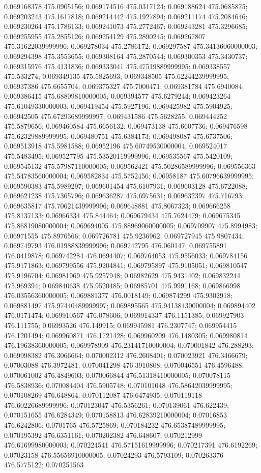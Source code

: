 0.069168378 475.0905156; 0.069174516 475.0317124; 0.069188624 475.0685875; 0.069203243 475.1617818; 0.069214442 475.1927894; 0.069211174 475.2084646; 0.069230264 475.1786133; 0.069241073 475.2772467; 0.069243281 475.3296685; 0.069255955 475.2855126; 0.069254129 475.2890245; 0.069267807 475.31622039999996; 0.069278034 475.2786172; 0.069297587 475.34136060000003; 0.069294398 475.3553655; 0.069308164 475.2870544; 0.069300353 475.3430737; 0.069315976 475.4131836; 0.069333041 475.47519889999995; 0.069338557 475.533274; 0.069349135 475.5825693; 0.069348505 475.62244239999995; 0.06937386 475.6655704; 0.069375327 475.7000471; 0.069381784 475.6940084; 0.069386415 475.68809810000005; 0.069394577 475.6279244; 0.069423264 475.61049330000003; 0.069419454 475.5927196; 0.069425982 475.5904925; 0.06942505 475.67293689999997; 0.069431586 475.5628255; 0.069444252 475.5879656; 0.069460584 475.6656132; 0.069473138 475.6607736; 0.069476598 475.62329889999995; 0.069480751 475.6384173; 0.069498087 475.6737506; 0.069513918 475.5981588; 0.06952196 475.60749530000004; 0.069524017 475.5483495; 0.069527795 475.53520119999996; 0.069535567 475.5420109; 0.069545132 475.57987110000005; 0.069562421 475.50286589999996; 0.069556363 475.54783560000004; 0.069582834 475.5752456; 0.06958187 475.60796639999995; 0.069590383 475.5989297; 0.069601454 475.6107931; 0.069603128 475.6722088; 0.069621238 475.7365796; 0.069636287 475.6975631; 0.069632397 475.716793; 0.069635817 475.70621439999996; 0.069648881 475.8067323; 0.069666258 475.8137133; 0.06966334 475.844464; 0.069679434 475.7624479; 0.069675345 475.86819080000004; 0.069694005 475.88969060000005; 0.069709907 475.8994983; 0.06971555 475.8976566; 0.069726781 475.9236962; 0.069727945 475.9807434; 0.069749793 476.01988839999996; 0.069742795 476.060147; 0.069755891 476.0419878; 0.069742284 476.0694407; 0.069764053 475.9556033; 0.069784156 475.9171863; 0.069799556 475.9204841; 0.069795897 475.9105051; 0.069810547 475.9196704; 0.06981969 475.9257948; 0.06982629 475.9431402; 0.069832244 475.969394; 0.069840638 475.9520485; 0.06985701 475.9991168; 0.069866998 476.03556360000005; 0.069881377 476.0018149; 0.069874299 475.9302918; 0.069881497 475.97440489999997; 0.069895565 475.94138430000004; 0.069894402 476.0171474; 0.069910567 476.078606; 0.069914337 476.1151385; 0.069927903 476.111755; 0.06993526 476.149915; 0.069945981 476.2307747; 0.069954415 476.1201494; 0.069960871 476.1721428; 0.069960209 476.1480305; 0.069980814 476.19638360000005; 0.069978909 476.23141710000004; 0.070001842 476.288293; 0.069998382 476.3066664; 0.070002312 476.2608401; 0.070023921 476.3466679; 0.07003088 476.3972481; 0.070041298 476.3910808; 0.070046551 476.4596488; 0.070061002 476.4849603; 0.070066844 476.51318410000005; 0.070078115 476.5838936; 0.070084404 476.5905748; 0.070101048 476.58642039999995; 0.070108269 476.648864; 0.070112087 476.6474935; 0.070119118 476.60226689999996; 0.070123047 476.5356261; 0.070139061 476.622439; 0.070151655 476.6284349; 0.070158813 476.62839210000004; 0.07016853 476.6242806; 0.0701765 476.5725869; 0.070184232 476.65387489999995; 0.070195392 476.6351161; 0.070202382 476.648607; 0.070212999 476.61699980000003; 0.070224541 476.57151619999996; 0.070217391 476.6192269; 0.07023158 476.55656910000005; 0.07024293 476.5793109; 0.070263376 476.5775122; 0.070251563 